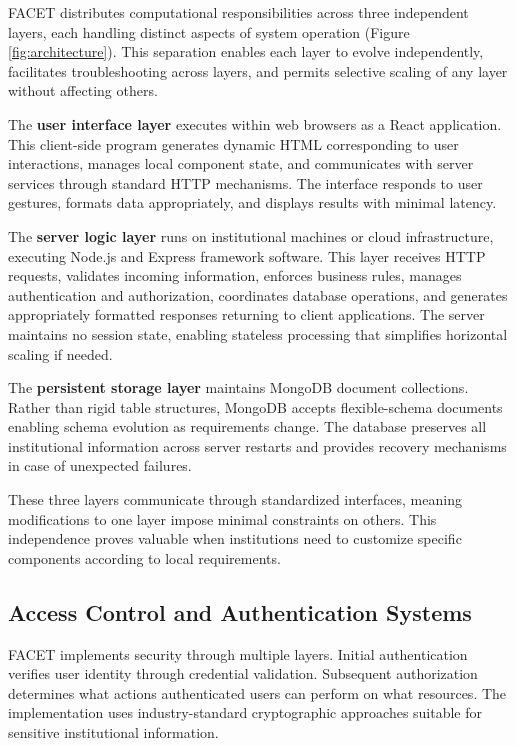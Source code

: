 \documentclass[conference]{IEEEtran}
\begin{document}
FACET distributes computational responsibilities across three independent layers, each handling distinct aspects of system operation (Figure \ref{fig:architecture}). This separation enables each layer to evolve independently, facilitates troubleshooting across layers, and permits selective scaling of any layer without affecting others.

The \textbf{user interface layer} executes within web browsers as a React application. This client-side program generates dynamic HTML corresponding to user interactions, manages local component state, and communicates with server services through standard HTTP mechanisms. The interface responds to user gestures, formats data appropriately, and displays results with minimal latency.

The \textbf{server logic layer} runs on institutional machines or cloud infrastructure, executing Node.js and Express framework software. This layer receives HTTP requests, validates incoming information, enforces business rules, manages authentication and authorization, coordinates database operations, and generates appropriately formatted responses returning to client applications. The server maintains no session state, enabling stateless processing that simplifies horizontal scaling if needed.

The \textbf{persistent storage layer} maintains MongoDB document collections. Rather than rigid table structures, MongoDB accepts flexible-schema documents enabling schema evolution as requirements change. The database preserves all institutional information across server restarts and provides recovery mechanisms in case of unexpected failures.

These three layers communicate through standardized interfaces, meaning modifications to one layer impose minimal constraints on others. This independence proves valuable when institutions need to customize specific components according to local requirements.

\subsection{Access Control and Authentication Systems}
\label{subsec:auth}

FACET implements security through multiple layers. Initial authentication verifies user identity through credential validation. Subsequent authorization determines what actions authenticated users can perform on what resources. The implementation uses industry-standard cryptographic approaches suitable for sensitive institutional information.
\end{document}
